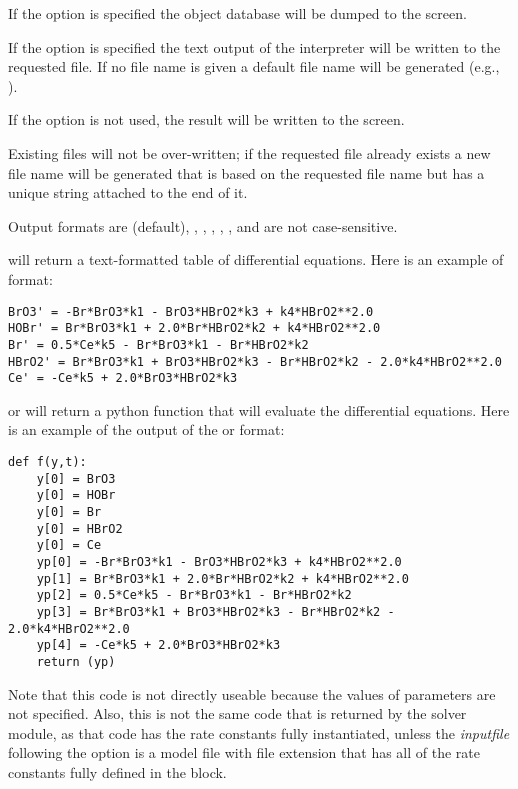 If the  option is specified the  object database will be dumped to the screen.

If the  option is specified the text output of the interpreter will be written to the requested file. If no file name is given a default file name will be generated (e.g., ). 

If the  option is not used, the result will be written to the screen.

Existing files will not be over-written; if the requested file already exists a new file name will be generated that is based on the requested file name but has a unique string attached to the end of it.

Output formats are  (default), , , , , ,  and are not case-sensitive.


\clearpage

 will return a text-formatted table of differential equations. Here is an example of  format:

\begin{lstlisting}
BrO3' = -Br*BrO3*k1 - BrO3*HBrO2*k3 + k4*HBrO2**2.0
HOBr' = Br*BrO3*k1 + 2.0*Br*HBrO2*k2 + k4*HBrO2**2.0
Br' = 0.5*Ce*k5 - Br*BrO3*k1 - Br*HBrO2*k2
HBrO2' = Br*BrO3*k1 + BrO3*HBrO2*k3 - Br*HBrO2*k2 - 2.0*k4*HBrO2**2.0
Ce' = -Ce*k5 + 2.0*BrO3*HBrO2*k3
\end{lstlisting}

 or  will return a python function that will evaluate the differential equations. Here is an example of the output of the  or  format:

\begin{lstlisting}[frame=single]
def f(y,t):
    y[0] = BrO3
    y[0] = HOBr
    y[0] = Br
    y[0] = HBrO2
    y[0] = Ce
    yp[0] = -Br*BrO3*k1 - BrO3*HBrO2*k3 + k4*HBrO2**2.0
    yp[1] = Br*BrO3*k1 + 2.0*Br*HBrO2*k2 + k4*HBrO2**2.0
    yp[2] = 0.5*Ce*k5 - Br*BrO3*k1 - Br*HBrO2*k2
    yp[3] = Br*BrO3*k1 + BrO3*HBrO2*k3 - Br*HBrO2*k2 - 2.0*k4*HBrO2**2.0
    yp[4] = -Ce*k5 + 2.0*BrO3*HBrO2*k3
    return (yp)
\end{lstlisting}

Note that this code is not directly useable because the values of parameters are not specified. Also, this is not the same code that is returned by the solver module, as that code has the rate constants fully instantiated, unless the \textit{inputfile} following the  option is a model file with file extension  that has all of the rate constants fully defined in the  block. 

